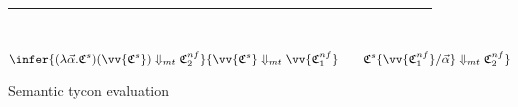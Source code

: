 
\begin{figure}
\centering
\hrule 
\small
\setlength{\tabcolsep}{0ex}
\renewcommand{\arraystretch}{1.1}
~\\[1mm]
\begin{equation}
\infer{(\lambda\vec{\alpha}.\mathfrak{C}^s)(\vv{\mathfrak{C}^s}) \Downarrow_{mt} \mathfrak{C}^{nf}_2}
{\vv{\mathfrak{C}^s}\Downarrow_{mt} \vv{\mathfrak{C}^{nf}_1}\qquad\mathfrak{C}^s\{\vv{\mathfrak{C}^{nf}_1}/\vec{\alpha}\} \Downarrow_{mt} \mathfrak{C}^{nf}_2} 
\end{equation}
\caption{Semantic tycon evaluation}
\label{fig:semtyceval}
\end{figure}